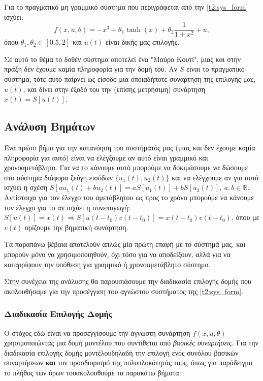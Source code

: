 \documentclass[12pt]{article} %
\numberwithin{equation}{section}  %
\begin{document}
Για το πραγματικό μη γραμμικό σύστημα που περιγράφεται από την \eqref{t2:sys_form} ισχύει:
\begin{equation}\label{t2:f_true}
    f(x, u, \theta) = - x^3 + \theta_1 \tanh(x) + \theta_2 \frac{1}{1 + x^2} + u, 
\end{equation}
όπου $\theta_1, \theta_2 \in [0.5, 2]$ και $u(t)$ είναι δικής μας επιλογής. 

Σε αυτό το θέμα το δοθέν σύστημα αποτελεί ένα "Μαύρο Κουτί", μιας και στην πράξη δεν έχουμε καμία πληροφορία για την δομή του. 
Αν $S$ είναι το πραγματικό σύστημα, τότε αυτό παίρνει ως είσοδο μια οποιαδήποτε συνάρτηση της επιλογής μας, $u(t)$, 
και δίνει στην έξοδό του την (επίσης μετρήσιμη) συνάρτηση $x(t) = S[u(t)]$.


\subsection{Ανάλυση Βημάτων}
Ένα πρώτο βήμα για την κατανόηση του συστήματός μας (μιας και δεν έχουμε καμία πληροφορία για αυτό) 
είναι να ελέγξουμε αν αυτό είναι γραμμικό και χρονοαμετάβλητο.
Για να το κάνουμε αυτό μπορούμε να δοκιμάσουμε να δώσουμε στο σύστημα διάφορα ζεύγη εισόδων $\{u_1(t), u_2(t)\}$
και να ελέγχουμε αν για αυτά ισχύει η σχέση $S[au_1(t) + bu_2(t)] = aS[u_1(t)] + bS[u_2(t)],\ a,b \in \mathbb{R}$.
Αντίστοιχα για τον έλεγχο του αμετάβλητου ως προς το χρόνο μπορούμε να κάνουμε τον έλεγχο για το αν ισχύει η συνεπαγωγή: 
$S[u(t)] = x(t) \Rightarrow S[u(t - t_0)v(t-t_0)] = x(t-t_0)v(t-t_0)$, όπου με $v(t)$ ορίζουμε την βηματική συνάρτηση. 

Τα παραπάνω βέβαια αποτελούν απλώς μία πρώτη επαφή με το σύστημά μας, και μπορούν μόνο να χρησιμοποιηθούν, 
όχι τόσο για να αποδείξουν, αλλά για να 
καταρρίψουν την υπόθεση για γραμμικό ή χρονοαμετάβλητο σύστημα. 

Στην συνέχεια της ανάλυσης θα παρουσιάσουμε την διαδικασία επιλογής δομής που ακολουθήσαμε για την προσέγγιση του αγνώστου συστήματος της \eqref{t2:sys_form}.


\subsubsection{Διαδικασία Επιλογής Δομής}

Ο στόχος εδώ είναι να προσεγγίσουμε την άγνωστη συνάρτηση \(f(x, u, \theta)\) χρησιμοποιώντας μια δομή μοντέλου που συντίθεται από \textit{βασικές συναρτήσεις}. 
Για την διαδικασία επιλογής δομής μοντέλου\textemdash δηλαδή την επιλογή ενός συνόλου βασικών συναρτήσεων \textbf{και} τον προσδιορισμό της πολυπλοκότητάς τους, όπως για παράδειγμα το πλήθος των όρων του\textemdash ακολουθούμε τα παρακάτω βήματα:
\end{document}
